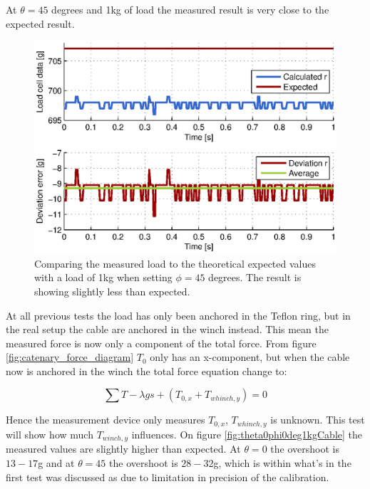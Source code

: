 \noindent
At $\theta=45$ degrees and 1kg of load the measured result is very close to the expected result.

\begin{figure}[hbtp]
\centering
\includegraphics[scale=1]{graphics/gcs_test/45degTheta1kg.eps}
\caption[Comparing the measured load to the theoretical value, $\phi=45$ degrees]{Comparing the measured load to the theoretical expected values with a load of 1kg when setting $\phi=45$ degrees. The result is showing slightly less than expected.}
\label{fig:45degTheta1kg}
\end{figure}

\noindent
At all previous tests the load has only been anchored in the Teflon ring, but in the real setup the cable are anchored in the winch instead. This mean the measured force is now only a component of the total force. From figure \ref{fig:catenary_force_diagram} $T_0$ only has an x-component, but when the cable now is anchored in the winch the total force equation change to:

\begin{equation}
\sum T -\lambda gs + (T_{0,x} + T_{whinch,y} ) = 0
\end{equation}

\noindent
Hence the measurement device only measures $T_{0,x}$, $T_{whinch,y}$ is unknown. This test will show how much $T_{winch,y}$ influences.
On figure \ref{fig:theta0phi0deg1kgCable} the measured values are slightly higher than expected. At $\theta = 0$ the overshoot is $13-17$g and at $\theta = 45$ the overshoot is $28-32$g, which is within what's in the first test was discussed as due to limitation in precision of the calibration. 

